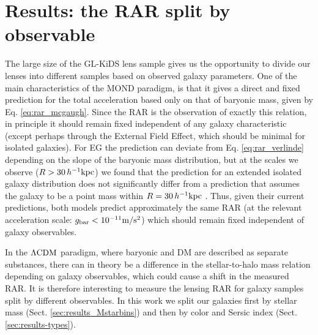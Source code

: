 \documentclass[usenatbib]{mnras}
\newcommand{\hkpc}{\, h^{-1}{\rm{kpc}} }
\newcommand{\mpss}{ {\rm m/s^2} }
\newcommand{\lcdm}{{\rm \Lambda CDM}}
\newcommand{\un}[1]{_{\rm #1}}
\begin{document}

\section{Results: the RAR split by observable}
\label{sec:results-observables}

The large size of the GL-KiDS lens sample gives us the opportunity to divide our lenses into different samples based on observed galaxy parameters. One of the main characteristics of the MOND paradigm, is that it gives a direct and fixed prediction for the total acceleration based only on that of baryonic mass, given by Eq. \ref{eq:rar_mcgaugh}. Since the RAR is the observation of exactly this relation, in principle it should remain fixed independent of any galaxy characteristic (except perhaps through the External Field Effect, which should be minimal for isolated galaxies). For EG the prediction can deviate from Eq. \ref{eq:rar_verlinde} depending on the slope of the baryonic mass distribution, but at the scales we observe ($R>30\hkpc$) we found that the prediction for an extended isolated galaxy distribution does not significantly differ from a prediction that assumes the galaxy to be a point mass within $R=30\hkpc$ \cite[see Sect. 4.3 of][]{brouwer2017}. Thus, given their current predictions, both models predict approximately the same RAR (at the relevant acceleration scale: $g\un{bar}<10^{-11} \mpss$) which should remain fixed independent of galaxy observables.

In the $\lcdm$ paradigm, where baryonic and DM are described as separate substances, there can in theory be a difference in the stellar-to-halo mass relation depending on galaxy observables, which could cause a shift in the measured RAR. It is therefore interesting to measure the lensing RAR for galaxy samples split by different observables. In this work we split our galaxies first by stellar mass (Sect. \ref{sec:results_Mstarbins}) and then by color and Sersic index (Sect. \ref{sec:results-types}).
\end{document}
